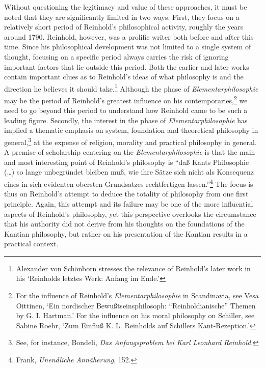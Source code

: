  Without questioning the legitimacy and value of these approaches, it must be noted that they are significantly limited in two ways. First, they focus on a relatively short period of Reinhold's philosophical activity, roughly the years around 1790. Reinhold, however, was a prolific writer both before and after this time. Since his philosophical development was not limited to a single system of thought, focusing on a specific period always carries the risk of ignoring important factors that lie outside this period. Both the earlier and later works contain important clues as to Reinhold's ideas of what philosophy is and the direction he believes it should take.\footnote{ Alexander von Sch\"{o}nborn stresses the relevance of Reinhold's later work in his `Reinholds letztes Werk: Anfang im Ende.'} Although the phase of \textit{Elementarphilosophie} may be the period of Reinhold's greatest influence on his contemporaries,\footnote{ For the influence of Reinhold's \textit{Elementarphilosophie} in Scandinavia, see Vesa Oittinen, `Ein nordischer Bewu\ss{}tseinsphilosoph: ``Reinholdianische'' Themen by G. I. Hartman.' For the influence on his moral philosophy on Schiller, see Sabine Roehr, `Zum Einflu\ss{} K. L. Reinholds auf Schillers Kant{-}Rezeption.'} we need to go beyond this period to understand how Reinhold came to be such a leading figure. Secondly, the interest in the phase of \textit{Elementarphilosophie} has implied a thematic emphasis on system, foundation and theoretical philosophy in general,\footnote{ See, for instance, Bondeli, \textit{Das Anfangsproblem bei Karl Leonhard Reinhold}.} at the expense of religion, morality and practical philosophy in general. A premise of scholarship centering on the \textit{Elementarphilosophie }is that the main and most interesting point of Reinhold's philosophy is ``da\ss{} Kants Philosophie (\ldots ) so lange unbegr\"{u}ndet bleiben mu\ss{}, wie ihre S\"{a}tze sich nicht als Konsequenz eines in sich evidenten obersten Grundsatzes rechtfertigen lassen.''\footnote{ Frank, \textit{Unendliche Ann\"{a}herung}, 152. } The focus is thus on Reinhold's attempt to deduce the totality of philosophy from one first principle. Again, this attempt and its failure may be one of the more influential aspects of Reinhold's philosophy, yet this perspective overlooks the circumstance that his authority did not derive from his thoughts on the foundations of the Kantian philosophy, but rather on his presentation of the Kantian results in a practical context.

